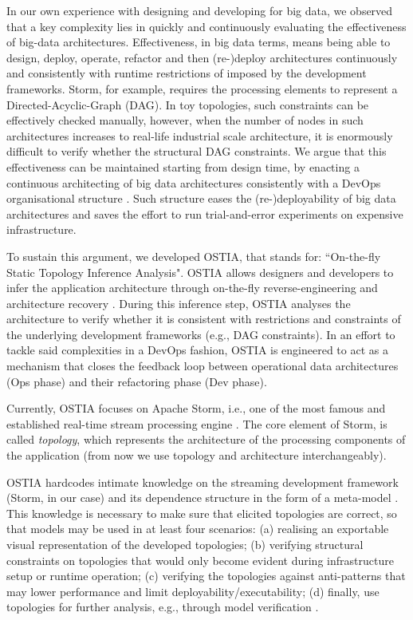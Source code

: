 In our own experience with designing and developing for big data, we observed that a key complexity lies in quickly and continuously evaluating the effectiveness of big-data architectures. Effectiveness, in big data terms, means being able to design, deploy, operate, refactor and then (re-)deploy architectures continuously and consistently with runtime restrictions of imposed by the development frameworks. Storm, for example, requires the processing elements to represent a Directed-Acyclic-Graph (DAG). In toy topologies, such constraints can be effectively checked manually, however, when the number of nodes in such architectures increases to real-life industrial scale architecture, it is enormously difficult to verify whether the structural DAG constraints.
We argue that this effectiveness can be maintained starting from design time, by enacting a continuous architecting of big data architectures consistently with a DevOps organisational structure \cite{ossslr,devops}. Such structure eases the (re-)deployability of big data architectures and saves the effort to run trial-and-error experiments on expensive infrastructure.

To sustain this argument, we developed OSTIA, that stands for: ``On-the-fly Static Topology Inference Analysis". OSTIA allows designers and developers to infer the application architecture through on-the-fly reverse-engineering and architecture recovery \cite{archrec}. During this inference step, OSTIA analyses the architecture to verify whether it is consistent with restrictions and constraints of the underlying development frameworks (e.g., DAG constraints). In an effort to tackle said complexities in a DevOps fashion, OSTIA is engineered to act as a mechanism that closes the feedback loop between operational data architectures (Ops phase) and their refactoring phase (Dev phase).

Currently, OSTIA focuses on Apache Storm, i.e., one of the most famous and established real-time stream processing engine \cite{storm, toshniwal2014storm}. The core element of Storm, is called \emph{topology}, which represents the architecture of the processing components of the application (from now we use topology and architecture interchangeably).

OSTIA hardcodes intimate knowledge on the streaming development framework (Storm, in our case) and its dependence structure in the form of a meta-model \cite{mda}. This knowledge is necessary to make sure that elicited topologies are correct, so that models may be used in at least four scenarios: (a) realising an exportable visual representation of the developed topologies; (b) verifying structural constraints on topologies that would only become evident during infrastructure setup or runtime operation; (c) verifying the topologies against anti-patterns \cite{patternoriented2000} that may lower performance and limit deployability/executability; (d) finally, use topologies for further analysis, e.g., through model verification \cite{icsoft}.

